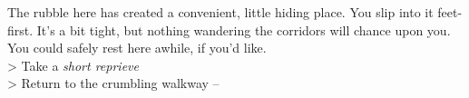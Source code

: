 The rubble here has created a convenient, little hiding place. You slip into it feet-first. It’s a bit tight, but nothing wandering the corridors will chance upon you. You could safely rest here awhile, if you’d like.\\

> Take a \emph{short reprieve}\\
> Return to the crumbling walkway -- 
